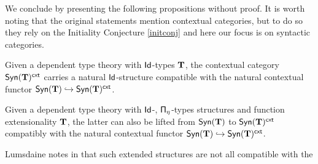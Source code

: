 We conclude by presenting the following propositions without proof. It is worth
noting that the original statements mention contextual categories, but to do so
they rely on the Initiality Conjecture \ref{initconj} and here our focus is on
syntactic categories.

\begin{lem}
  Given a dependent type theory with $\operatorname{\mathsf{Id}}$-types $\operatorname{\mathbf{T}}$, the contextual category
  $\mathsf{Syn}(\mathbf{T})^{\operatorname{\mathsf{cxt}}}$ carries a natural $\operatorname{\mathsf{Id}}$-structure compatible with the
  natural contextual functor $\mathsf{Syn}(\mathbf{T})\hookrightarrow\mathsf{Syn}(\mathbf{T})^{\operatorname{\mathsf{cxt}}}$.
\end{lem}

\begin{lem}[{\cite[Lemma 2.28]{KS19}}]
  Given a dependent type theory with $\operatorname{\mathsf{Id}}$-, $\operatorname{\mathsf{\Pi}_\eta}$-types structures and
  function extensionality $\operatorname{\mathbf{T}}$, the latter can also be lifted from $\mathsf{Syn}(\mathbf{T})$ to
  $\mathsf{Syn}(\mathbf{T})^{\operatorname{\mathsf{cxt}}}$ compatibly with the natural contextual functor
  $\mathsf{Syn}(\mathbf{T})\hookrightarrow\mathsf{Syn}(\mathbf{T})^{\operatorname{\mathsf{cxt}}}$.
\end{lem}

\begin{rmk}
  Lumsdaine notes in \cite{Lum10} that such extended structures are not all
  compatible with the 
\end{rmk}
